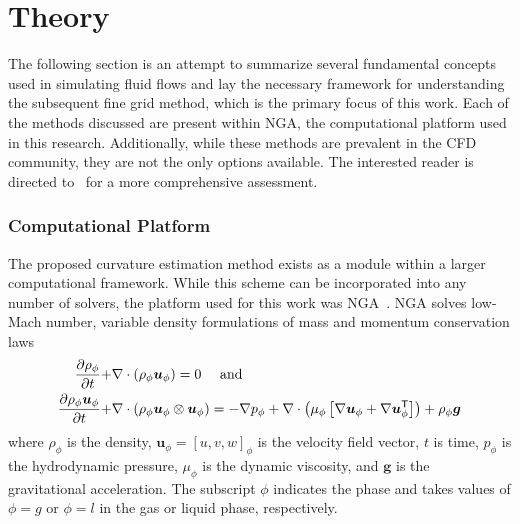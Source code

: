 \chapter{Theory} \label{CH:theory}
The following section is an attempt to summarize several fundamental concepts used in simulating fluid flows and lay the necessary framework for understanding the subsequent fine grid method, which is the primary focus of this work. Each of the methods discussed are present within NGA, the computational platform used in this research. Additionally, while these methods are prevalent in the CFD community, they are not the only options available. The interested reader is directed to~\cite{TRYG} for a more comprehensive assessment.   

\subsection{Computational Platform}
The proposed curvature estimation method exists as a module within a larger computational framework. While this scheme can be incorporated into any number of solvers, the platform used for this work was NGA~\cite{NGA1,NGA2}.  NGA solves low-Mach number, variable density formulations of mass and momentum conservation laws
\begin{align}
\frac{\partial \rho_\phi}{\partial t} +& \nabla \cdot \left(\rho_\phi\mbox{\boldmath{$u$}}_\phi\right) = 0\mbox{ \quad and}\\
\frac{\partial \rho_\phi \mbox{\boldmath{$u$}}_\phi}{\partial t} +& \nabla \cdot \left(\rho_\phi\mbox{\boldmath{$u$}}_\phi\otimes\mbox{\boldmath{$u$}}_\phi\right) = -\nabla p_\phi + \nabla\cdot\left(\mu_\phi\left[\nabla\mbox{\boldmath{$u$}}_\phi+\nabla\mbox{\boldmath{$u$}}_\phi^\mathsf{T}\right]\right)+\rho_\phi\mbox{\boldmath{$g$}}
\end{align}
where
$\rho_\phi$ is the density,
$\bm{u}_\phi=[u,v,w]_\phi$ is the velocity field vector,
$t$ is time,
$p_\phi$ is the hydrodynamic pressure,
$\mu_\phi$ is the dynamic viscosity, and
$\bm{g}$ is the gravitational acceleration.
The subscript
$\phi$ indicates the phase and takes values of $\phi=g$ or
$\phi=l$ in the gas or liquid phase, respectively.


